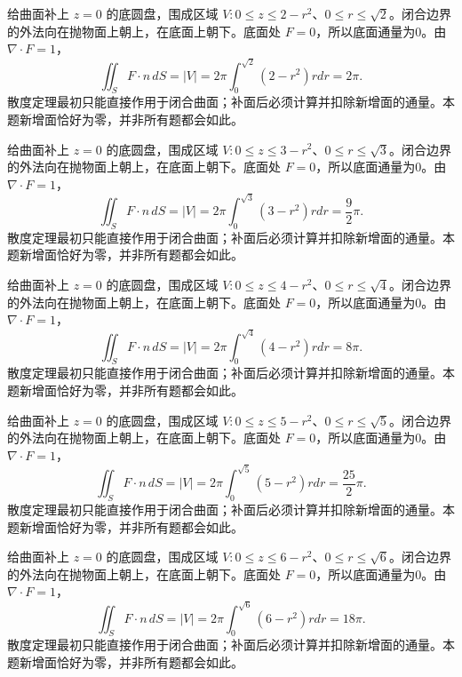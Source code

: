 \documentclass[UTF8,12pt,a4paper,fontset=fandol]{ctexart}
\begin{document}
\begin{solve}\label{ans:c44q20}
给曲面补上 $z=0$ 的底圆盘，围成区域 $V:0\le z\le 2-r^2$、$0\le r\le\sqrt{2}$。闭合边界的外法向在抛物面上朝上，在底面上朝下。底面处 $F=0$，所以底面通量为0。由 $\nabla\cdot F=1$，
\[
\iint_SF\cdot n\,dS=|V|=2\pi\int_0^{\sqrt{2}}(2-r^2)rdr=2\pi.
\]
散度定理最初只能直接作用于闭合曲面；补面后必须计算并扣除新增面的通量。本题新增面恰好为零，并非所有题都会如此。
\end{solve}

\begin{solve}\label{ans:c44q21}
给曲面补上 $z=0$ 的底圆盘，围成区域 $V:0\le z\le 3-r^2$、$0\le r\le\sqrt{3}$。闭合边界的外法向在抛物面上朝上，在底面上朝下。底面处 $F=0$，所以底面通量为0。由 $\nabla\cdot F=1$，
\[
\iint_SF\cdot n\,dS=|V|=2\pi\int_0^{\sqrt{3}}(3-r^2)rdr=\frac{9}{2}\pi.
\]
散度定理最初只能直接作用于闭合曲面；补面后必须计算并扣除新增面的通量。本题新增面恰好为零，并非所有题都会如此。
\end{solve}

\begin{solve}\label{ans:c44q22}
给曲面补上 $z=0$ 的底圆盘，围成区域 $V:0\le z\le 4-r^2$、$0\le r\le\sqrt{4}$。闭合边界的外法向在抛物面上朝上，在底面上朝下。底面处 $F=0$，所以底面通量为0。由 $\nabla\cdot F=1$，
\[
\iint_SF\cdot n\,dS=|V|=2\pi\int_0^{\sqrt{4}}(4-r^2)rdr=8\pi.
\]
散度定理最初只能直接作用于闭合曲面；补面后必须计算并扣除新增面的通量。本题新增面恰好为零，并非所有题都会如此。
\end{solve}

\begin{solve}\label{ans:c44q23}
给曲面补上 $z=0$ 的底圆盘，围成区域 $V:0\le z\le 5-r^2$、$0\le r\le\sqrt{5}$。闭合边界的外法向在抛物面上朝上，在底面上朝下。底面处 $F=0$，所以底面通量为0。由 $\nabla\cdot F=1$，
\[
\iint_SF\cdot n\,dS=|V|=2\pi\int_0^{\sqrt{5}}(5-r^2)rdr=\frac{25}{2}\pi.
\]
散度定理最初只能直接作用于闭合曲面；补面后必须计算并扣除新增面的通量。本题新增面恰好为零，并非所有题都会如此。
\end{solve}

\begin{solve}\label{ans:c44q24}
给曲面补上 $z=0$ 的底圆盘，围成区域 $V:0\le z\le 6-r^2$、$0\le r\le\sqrt{6}$。闭合边界的外法向在抛物面上朝上，在底面上朝下。底面处 $F=0$，所以底面通量为0。由 $\nabla\cdot F=1$，
\[
\iint_SF\cdot n\,dS=|V|=2\pi\int_0^{\sqrt{6}}(6-r^2)rdr=18\pi.
\]
散度定理最初只能直接作用于闭合曲面；补面后必须计算并扣除新增面的通量。本题新增面恰好为零，并非所有题都会如此。
\end{solve}
\end{document}
